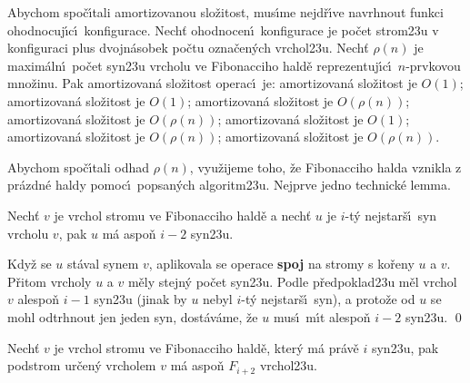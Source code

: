 \flushpar Abychom spo\v c\'\i tali amortizovanou slo\v zitost, 
mus\'\i me nejd\v r\'\i ve navrhnout funkci ohodnocuj\'\i\-c\'\i\ 
konfigurace.  Nech\v t ohodnocen\'\i\ konfigurace je po\v cet 
strom\accent23u v konfiguraci plus dvojn\'aso\-bek po\v ctu 
ozna\v cen\'ych vrchol\accent23u.  Nech\v t $\rho \left(n\right)$ je maxim\'aln\'\i\ 
po\v cet syn\accent23u vrcholu ve Fibonacciho hald\v e 
reprezentuj\'\i c\'\i\ $n$-prvkovou mno\v zinu.  Pak amortizovan\'a 
slo\v zitost operac\'\i\ je:\newline 
\phantom{---}{\bf MERGE} amortizovan\'a slo\v zitost je $O\left(1\right)$;\newline 
\phantom{---}{\bf INSERT} amortizovan\'a slo\v zitost je $O\left(1\right)$;\newline 
\phantom{---}{\bf MIN} amortizovan\'a slo\v zitost je $O\left(\rho \left(n\right)\right)$;\newline 
\phantom{---}{\bf DELETEMIN} amortizovan\'a slo\v zitost je 
$O\left(\rho \left(n\right)\right)$;\newline 
\phantom{---}{\bf DECREASE} amortizovan\'a slo\v zitost je $O\left(1\right)$;\newline 
\phantom{---}{\bf INCREASE} amortizovan\'a slo\v zitost je 
$O\left(\rho \left(n\right)\right)$;\newline 
\phantom{---}{\bf DELETE} amortizovan\'a slo\v zitost je $O\left(\rho \left(n\right)\right)$.
\medskip

\flushpar Abychom spo\v c\'\i tali odhad $\rho \left(n\right)$, vyu\v zijeme toho, \v ze 
Fibonacciho halda vznikla z pr\'azdn\'e haldy pomoc\'\i\ 
popsan\'ych algoritm\accent23u. Nejprve jedno technick\'e 
lemma.
\medskip

Nech\v t $v$ je vrchol stromu ve 
Fibonacciho hald\v e a nech\v t $u$ je $i$-t\'y nejstar\v s\'\i\ syn 
vrcholu $v$, pak $u$ m\'a aspo\v n $i-2$ syn\accent23u.
\endproclaim

\demo{D\accent23ukaz}Kdy\v z se $u$ st\'aval synem $v$, 
aplikovala se operace {\bf spoj} na stromy s ko\v reny $u$ a $v$. 
P\v ritom vrcholy $u$ a $v$ m\v ely stejn\'y po\v cet syn\accent23u. 
Podle p\v redpoklad\accent23u m\v el vrchol $v$ alespo\v n $i-1$ 
syn\accent23u (jinak by $u$ nebyl $i$-t\'y nejstar\v s\'\i\ syn), a 
proto\v ze od $u$ se mohl odtrhnout jen jeden syn, 
dost\'av\'ame, \v ze $u$ mus\'\i\ m\'\i t alespo\v n $i-2$ syn\accent23u. \qed
\enddemo


Nech\v t $v$ je vrchol stromu ve 
Fibonacciho hald\v e, kte\-r\'y m\'a pr\'av\v e $i$ syn\accent23u, pak 
podstrom ur\v cen\'y vrcholem $v$ m\'a aspo\v n $F_{i+2}$ 
vrchol\accent23u.
\endproclaim

